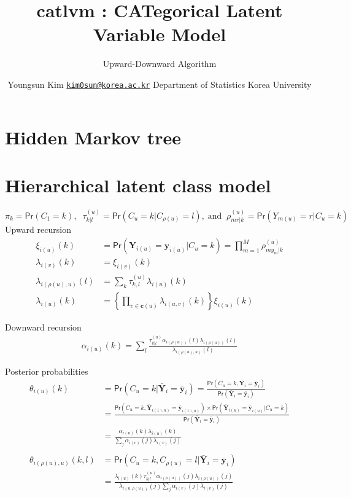 \documentclass[
  11pt,
]{article}
\title{catlvm : CATegorical Latent Variable Model}
\subtitle{Upward-Downward Algorithm}
\author{
   \name Youngsun Kim
   \email \href{mailto:kim0sun@korea.ac.kr}{\nolinkurl{kim0sun@korea.ac.kr}}
   \addr Department of Statistics \newline Korea University
   
}
\date{}
\begin{document}
\maketitle


\hypertarget{hmt}{%
\section{Hidden Markov tree}\label{hmt}}

\hypertarget{hlca}{%
\section{Hierarchical latent class model}\label{hlca}}

\[
\pi_k = \textsf{Pr}\left( C_1 = k \right),
\;\;
\tau_{k|l}^{(u)} = \textsf{Pr}\left( C_u = k|C_{\rho(u)} = l \right),
\; \text{and} \;\;
\rho_{mr|k}^{(u)} = \textsf{Pr}\left( Y_{m(u)} = r | C_{u} = k \right)
\]
Upward recursion
\[
\begin{aligned}
\xi_{i(u)}(k) &= \textsf{Pr}\left( \mathbf{Y}_{i(u)} = \mathbf{y}_{i(u)} | C_u = k \right) = 
\prod_{m = 1}^{M} \rho_{my_m|k}^{(u)}
\\
\lambda_{i(v)}(k) &= \xi_{i(v)}(k)
\\
\lambda_{i(\rho(u), u)}(l) &= \sum_k \tau_{k, l}^{(u)} \lambda_{i(u)}(k)
\\
\lambda_{i(u)}(k) &= \left\{ \prod_{v\in \mathbf{c}(u)} \lambda_{i(u, v)}(k) \right\} \xi_{i(u)}(k)
\end{aligned}
\]

Downward recursion
\[
\begin{aligned}
\alpha_{i(u)}(k) = \sum_{l}\frac{\tau_{k|l}^{(u)} \alpha_{i(\rho(u))}(l)  \lambda_{i(\rho(u))}(l)}{\lambda_{i(\rho(u), u)}(l)}
\end{aligned}
\]

Posterior probabilities
\[
\begin{aligned}
\theta_{i(u)}(k) &= \textsf{Pr}\left( C_u = k | \bar{\mathbf{Y}}_i = \bar{\mathbf{y}}_i \right) 
= \frac{ \textsf{Pr}\left( C_u = k, \bar{\mathbf{Y}}_i = \bar{\mathbf{y}}_i \right) }{ \textsf{Pr}\left( \bar{\mathbf{Y}}_i = \bar{\mathbf{y}}_i \right) }
\\
&=\frac{ \textsf{Pr}\left( C_u = k, \bar{\mathbf{Y}}_{i(1\backslash u)} = \bar{\mathbf{y}}_{i(1\backslash u)} \right) \times \textsf{Pr}\left( \bar{\mathbf{Y}}_{i(u)} = \bar{\mathbf{y}}_{i(u)} | C_u = k \right) }{ \textsf{Pr}\left( \bar{\mathbf{Y}}_i = \bar{\mathbf{y}}_i \right) }
\\
&= \frac{ \alpha_{i(u)}(k) \lambda_{i(u)}(k) }{ \sum_j \alpha_{i(v)}(j) \lambda_{i(v)}(j) }
\\
\\
\theta_{i(\rho(u), u)}(k,l) &= \textsf{Pr}\left( C_u = k, C_{\rho(u)} = l | \bar{\mathbf{Y}}_i = \bar{\mathbf{y}}_i \right) 
\\
&= \frac{\lambda_{i(u)}(k) \tau_{k|l}^{(u)} \alpha_{i(\rho(u))}(j)  \lambda_{i(\rho(u))}(j)}{\lambda_{i(u, \rho(u))}(j) \sum_j \alpha_{i(v)}(j) \lambda_{i(v)}(j)}
\end{aligned}
\]
\end{document}
